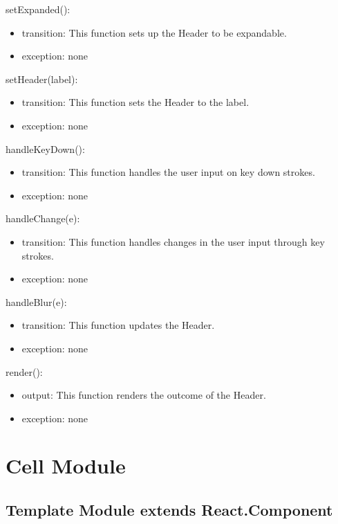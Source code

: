 \documentclass[12pt, titlepage]{article}
\begin{document}
\noindent setExpanded():
\begin{itemize}
\item transition: This function sets up the Header to be expandable.
\item exception: none
\end{itemize}

\noindent setHeader(label):
\begin{itemize}
\item transition: This function sets the Header to the label.
\item exception: none
\end{itemize}

\noindent handleKeyDown():
\begin{itemize}
\item transition: This function handles the user input on key down strokes.
\item exception: none
\end{itemize}

\noindent handleChange(e):
\begin{itemize}
\item transition: This function handles changes in the user input through key strokes.
\item exception: none
\end{itemize}

\noindent handleBlur(e):
\begin{itemize}
\item transition: This function updates the Header.
\item exception: none
\end{itemize}

\noindent render():
\begin{itemize}
\item output: This function renders the outcome of the Header.
\item exception: none
\end{itemize}

\newpage

\section{Cell Module}

\subsection{Template Module extends React.Component}
\end{document}
